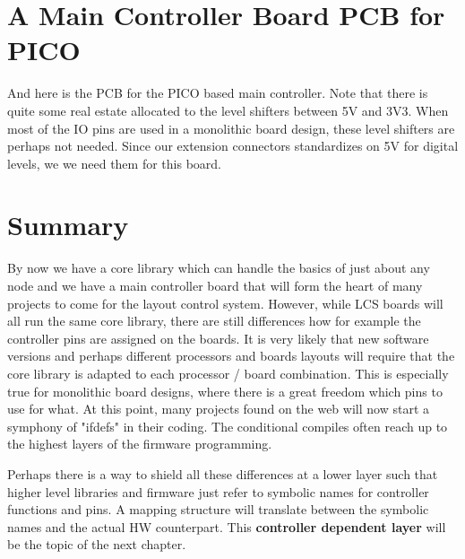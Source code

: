 \section{A Main Controller Board PCB for PICO}

And here is the PCB for the PICO based main controller. Note that there is quite some real estate allocated to the level shifters between 5V and 3V3. When most of the IO pins are used in a monolithic board design, these level shifters are perhaps not needed. Since our extension connectors standardizes on 5V for digital levels, we we need them for this board.

\FloatBarrier

\section{Summary}

By now we have a core library which can handle the basics of just about any node and we have a main controller board that will form the heart of many projects to come for the layout control system. However, while LCS boards will all run the same core library, there are still differences how for example the controller pins are assigned on the boards. It is very likely that new software versions and perhaps different processors and boards layouts will require that the core library is adapted to each processor / board combination. This is especially true for monolithic board designs, where there is a great freedom which pins to use for what. At this point, many projects found on the web will now start a symphony of "ifdefs" in their coding. The conditional compiles often reach up to the highest layers of the firmware programming. 

Perhaps there is a way to shield all these differences at a lower layer such that higher level libraries and firmware just refer to symbolic names for controller functions and pins. A mapping structure will translate between the symbolic names and the actual HW counterpart. This \textbf{controller dependent layer} will be the topic of the next chapter.
